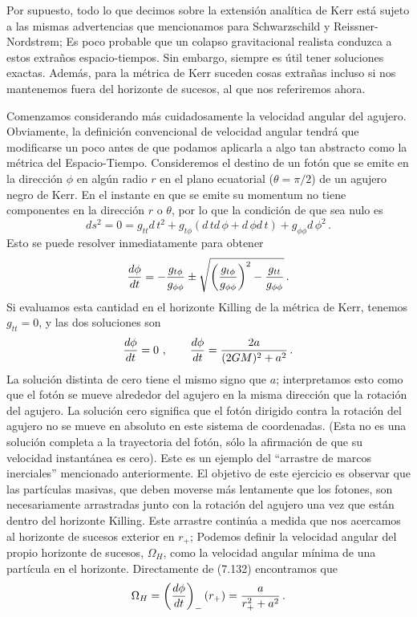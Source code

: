 \documentclass[11pt,b5paper,openany,twoside]{book}
\begin{document}
Por supuesto, todo lo que decimos sobre la extensión analítica de Kerr está sujeto a las mismas advertencias que mencionamos para Schwarzschild y Reissner-Nordstr{\o}m; Es poco probable que un colapso gravitacional realista conduzca a estos extraños espacio-tiempos.
Sin embargo, siempre es útil tener soluciones exactas.
Además, para la métrica de Kerr suceden cosas extrañas incluso si nos mantenemos fuera del horizonte de sucesos, al que nos referiremos ahora.

Comenzamos considerando más cuidadosamente la velocidad angular del agujero.
Obviamente, la definición convencional de velocidad angular tendrá que modificarse un poco antes de que podamos aplicarla a algo tan abstracto como la métrica del Espacio-Tiempo.
Consideremos el destino de un fotón que se emite en la dirección $\phi$ en algún radio $r$ en el plano ecuatorial ($\theta=\pi/2$) de un agujero negro de Kerr.
En el instante en que se emite su momentum no tiene componentes en la dirección $r$ o $\theta$, por lo que la condición de que sea nulo es
\begin{equation}
ds^2 = 0 = g_{tt} d\,t^2 + g_{t\phi}( d\,t d\,\phi+ d\,\phi  d\,t)
+g_{\phi\phi} d\,\phi^2\,.\label{7.131}
\end{equation}
Esto se puede resolver inmediatamente para obtener
\begin{equation}
{{d\phi}\over{dt}} = -{{g_{t\phi}}\over{g_{\phi\phi}}}
\pm\sqrt{\left({{g_{t\phi}}\over{g_{\phi\phi}}}\right)^2
-{{g_{tt}}\over{g_{\phi\phi}}}}\,.\label{7.132}
\end{equation}
Si evaluamos esta cantidad en el horizonte Killing de la métrica de Kerr, tenemos $g_{tt}=0$, y las dos soluciones son
\begin{equation}
{{d\phi}\over{dt}}=0\ ,\qquad {{d\phi}\over{dt}}={{2a}\over
{(2GM)^2+a^2}}\,.\label{7.133}
\end{equation}
La solución distinta de cero tiene el mismo signo que $a$; interpretamos esto como que el fotón se mueve alrededor del agujero en la misma dirección que la rotación del agujero.
La solución cero significa que el fotón dirigido contra la rotación del agujero no se mueve en absoluto en este sistema de coordenadas.
(Esta no es una solución completa a la trayectoria del fotón, sólo la afirmación de que su velocidad instantánea es cero).
Este es un ejemplo del ``arrastre de marcos inerciales'' mencionado anteriormente.
El objetivo de este ejercicio es observar que las partículas masivas, que deben moverse más lentamente que los fotones, son necesariamente arrastradas junto con la rotación del agujero una vez que están dentro del horizonte Killing.
Este arrastre continúa a medida que nos acercamos al horizonte de sucesos exterior en $r_+$; Podemos definir la velocidad angular del propio horizonte de sucesos, $\Omega_H$, como la velocidad angular mínima de una partícula en el horizonte.
Directamente de (7.132) encontramos que
\begin{equation}
\Omega_H = \left({{d\phi}\over{dt}}\right)_-(r_+)
= {a\over{r_+^2+a^2}}\,.\label{7.134}
\end{equation}
\end{document}

